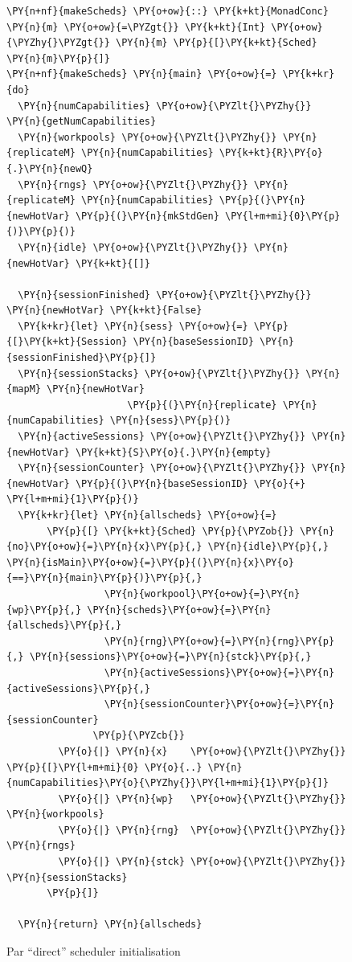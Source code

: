 \begin{figure}[t]

\begin{Verbatim}[commandchars=\\\{\}]
\PY{n+nf}{makeScheds} \PY{o+ow}{::} \PY{k+kt}{MonadConc} \PY{n}{m} \PY{o+ow}{=\PYZgt{}} \PY{k+kt}{Int} \PY{o+ow}{\PYZhy{}\PYZgt{}} \PY{n}{m} \PY{p}{[}\PY{k+kt}{Sched} \PY{n}{m}\PY{p}{]}
\PY{n+nf}{makeScheds} \PY{n}{main} \PY{o+ow}{=} \PY{k+kr}{do}
  \PY{n}{numCapabilities} \PY{o+ow}{\PYZlt{}\PYZhy{}} \PY{n}{getNumCapabilities}
  \PY{n}{workpools} \PY{o+ow}{\PYZlt{}\PYZhy{}} \PY{n}{replicateM} \PY{n}{numCapabilities} \PY{k+kt}{R}\PY{o}{.}\PY{n}{newQ}
  \PY{n}{rngs} \PY{o+ow}{\PYZlt{}\PYZhy{}} \PY{n}{replicateM} \PY{n}{numCapabilities} \PY{p}{(}\PY{n}{newHotVar} \PY{p}{(}\PY{n}{mkStdGen} \PY{l+m+mi}{0}\PY{p}{)}\PY{p}{)}
  \PY{n}{idle} \PY{o+ow}{\PYZlt{}\PYZhy{}} \PY{n}{newHotVar} \PY{k+kt}{[]}

  \PY{n}{sessionFinished} \PY{o+ow}{\PYZlt{}\PYZhy{}} \PY{n}{newHotVar} \PY{k+kt}{False}
  \PY{k+kr}{let} \PY{n}{sess} \PY{o+ow}{=} \PY{p}{[}\PY{k+kt}{Session} \PY{n}{baseSessionID} \PY{n}{sessionFinished}\PY{p}{]}
  \PY{n}{sessionStacks} \PY{o+ow}{\PYZlt{}\PYZhy{}} \PY{n}{mapM} \PY{n}{newHotVar}
                     \PY{p}{(}\PY{n}{replicate} \PY{n}{numCapabilities} \PY{n}{sess}\PY{p}{)}
  \PY{n}{activeSessions} \PY{o+ow}{\PYZlt{}\PYZhy{}} \PY{n}{newHotVar} \PY{k+kt}{S}\PY{o}{.}\PY{n}{empty}
  \PY{n}{sessionCounter} \PY{o+ow}{\PYZlt{}\PYZhy{}} \PY{n}{newHotVar} \PY{p}{(}\PY{n}{baseSessionID} \PY{o}{+} \PY{l+m+mi}{1}\PY{p}{)}
  \PY{k+kr}{let} \PY{n}{allscheds} \PY{o+ow}{=}
       \PY{p}{[} \PY{k+kt}{Sched} \PY{p}{\PYZob{}} \PY{n}{no}\PY{o+ow}{=}\PY{n}{x}\PY{p}{,} \PY{n}{idle}\PY{p}{,} \PY{n}{isMain}\PY{o+ow}{=}\PY{p}{(}\PY{n}{x}\PY{o}{==}\PY{n}{main}\PY{p}{)}\PY{p}{,}
                 \PY{n}{workpool}\PY{o+ow}{=}\PY{n}{wp}\PY{p}{,} \PY{n}{scheds}\PY{o+ow}{=}\PY{n}{allscheds}\PY{p}{,}
                 \PY{n}{rng}\PY{o+ow}{=}\PY{n}{rng}\PY{p}{,} \PY{n}{sessions}\PY{o+ow}{=}\PY{n}{stck}\PY{p}{,}
                 \PY{n}{activeSessions}\PY{o+ow}{=}\PY{n}{activeSessions}\PY{p}{,}
                 \PY{n}{sessionCounter}\PY{o+ow}{=}\PY{n}{sessionCounter}
               \PY{p}{\PYZcb{}}
         \PY{o}{|} \PY{n}{x}    \PY{o+ow}{\PYZlt{}\PYZhy{}} \PY{p}{[}\PY{l+m+mi}{0} \PY{o}{..} \PY{n}{numCapabilities}\PY{o}{\PYZhy{}}\PY{l+m+mi}{1}\PY{p}{]}
         \PY{o}{|} \PY{n}{wp}   \PY{o+ow}{\PYZlt{}\PYZhy{}} \PY{n}{workpools}
         \PY{o}{|} \PY{n}{rng}  \PY{o+ow}{\PYZlt{}\PYZhy{}} \PY{n}{rngs}
         \PY{o}{|} \PY{n}{stck} \PY{o+ow}{\PYZlt{}\PYZhy{}} \PY{n}{sessionStacks}
       \PY{p}{]}

  \PY{n}{return} \PY{n}{allscheds}
\end{Verbatim}
    \caption*{\dejafu{}}
  \caption{Par ``direct'' scheduler initialisation\\\hrulefill}
  \label{fig:dejafu-example-parmonad-sched}
\end{figure}
\captionsetup[figure]{format=underlined}

